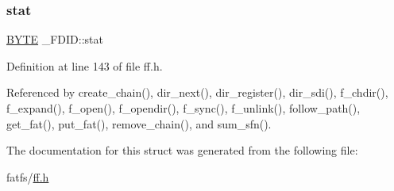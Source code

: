 \subsubsection{\texorpdfstring{stat}{stat}}
{\footnotesize\ttfamily \hyperlink{integer_8h_a4ae1dab0fb4b072a66584546209e7d58}{B\+Y\+TE} \+\_\+\+F\+D\+I\+D\+::stat}



Definition at line 143 of file ff.\+h.



Referenced by create\+\_\+chain(), dir\+\_\+next(), dir\+\_\+register(), dir\+\_\+sdi(), f\+\_\+chdir(), f\+\_\+expand(), f\+\_\+open(), f\+\_\+opendir(), f\+\_\+sync(), f\+\_\+unlink(), follow\+\_\+path(), get\+\_\+fat(), put\+\_\+fat(), remove\+\_\+chain(), and sum\+\_\+sfn().



The documentation for this struct was generated from the following file\+:\begin{DoxyCompactItemize}
\item 
fatfs/\hyperlink{ff_8h}{ff.\+h}\end{DoxyCompactItemize}
